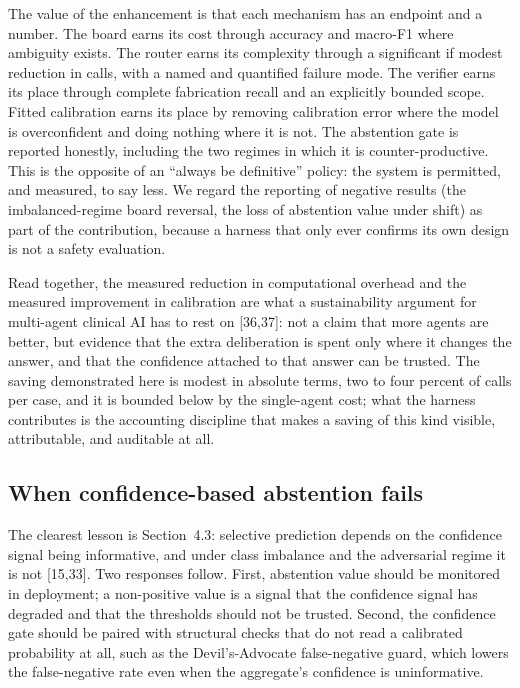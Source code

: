 \documentclass[12pt]{article}
\begin{document}
The value of the enhancement is that each mechanism has an endpoint and a number. The board earns its cost through accuracy and macro-F1 where ambiguity exists. The router earns its complexity through a significant if modest reduction in calls, with a named and quantified failure mode. The verifier earns its place through complete fabrication recall and an explicitly bounded scope. Fitted calibration earns its place by removing calibration error where the model is overconfident and doing nothing where it is not. The abstention gate is reported honestly, including the two regimes in which it is counter-productive. This is the opposite of an \enquote{always be definitive} policy: the system is permitted, and measured, to say less. We regard the reporting of negative results (the imbalanced-regime board reversal, the loss of abstention value under shift) as part of the contribution, because a harness that only ever confirms its own design is not a safety evaluation.


Read together, the measured reduction in computational overhead and the measured improvement in calibration are what a sustainability argument for multi-agent clinical AI has to rest on [36,37]: not a claim that more agents are better, but evidence that the extra deliberation is spent only where it changes the answer, and that the confidence attached to that answer can be trusted. The saving demonstrated here is modest in absolute terms, two to four percent of calls per case, and it is bounded below by the single-agent cost; what the harness contributes is the accounting discipline that makes a saving of this kind visible, attributable, and auditable at all.

\subsection{When confidence-based abstention fails}

The clearest lesson is Section~4.3: selective prediction depends on the confidence signal being informative, and under class imbalance and the adversarial regime it is not [15,33]. Two responses follow. First, abstention value should be monitored in deployment; a non-positive value is a signal that the confidence signal has degraded and that the thresholds should not be trusted. Second, the confidence gate should be paired with structural checks that do not read a calibrated probability at all, such as the Devil's-Advocate false-negative guard, which lowers the false-negative rate even when the aggregate's confidence is uninformative.
\end{document}
